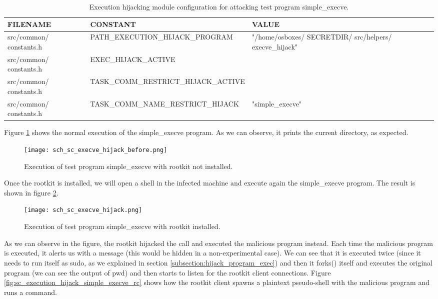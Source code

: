 \begin{table}[htbp]
\begin{tabular}{|>{\centering\arraybackslash}p{3cm}|>{\centering\arraybackslash}p{4.5cm}|>{\centering\arraybackslash}p{4cm}|}
\hline
\textbf{FILENAME} & \textbf{CONSTANT} & \textbf{VALUE}\\
\hline
\hline
src/common/ constants.h & PATH\_EXECUTION\_HIJACK\_PROGRAM & "/home/osboxes/ SECRETDIR/ src/helpers/ execve\_hijack"\\
\hline
src/common/ constants.h & EXEC\_HIJACK\_ACTIVE & 1\\
\hline
src/common/ constants.h & TASK\_COMM\_RESTRICT\_HIJACK\_ACTIVE & 1\\
\hline
src/common/ constants.h & TASK\_COMM\_NAME\_RESTRICT\_HIJACK & "simple\_execve"\\
\hline
\end{tabular}
\caption{Execution hijacking module configuration for attacking test program simple\_execve.}
\label{table:execution_hijack_config_simple_execve}
\end{table}

Figure \ref{fig:sc_execve_hijack_before_simple_execve} shows the normal execution of the simple\_execve program. As we can observe, it prints the current directory, as expected.

\begin{figure}[htbp]
	\centering
	\texttt{[image: sch\_sc\_execve\_hijack\_before.png]}
	\caption{Execution of test program simple\_execve with rootkit not installed.}
	\label{fig:sc_execve_hijack_before_simple_execve}
\end{figure}

Once the rootkit is installed, we will open a shell in the infected machine and execute again the simple\_execve program. The result is shown in figure \ref{fig:sc_execve_hijack_simple_execve}.

\begin{figure}[htbp]
	\centering
	\texttt{[image: sch\_sc\_execve\_hijack.png]}
	\caption{Execution of test program simple\_execve with rootkit installed.}
	\label{fig:sc_execve_hijack_simple_execve}
\end{figure}

As we can observe in the figure, the rootkit hijacked the call and executed the malicious program instead. Each time the malicious program is executed, it alerts us with a message (this would be hidden in a non-experimental case). We can see that it is executed twice (since it needs to run itself as sudo, as we explained in section \ref{subsection:hijack_program_exec}) and then it forks() itself and executes the original program (we can see the output of pwd) and then starts to listen for the rootkit client connections. Figure \ref{fig:sc_execution_hijack_simple_execve_rc} shows how the rootkit client spawns a plaintext pseudo-shell with the malicious program and runs a command.

